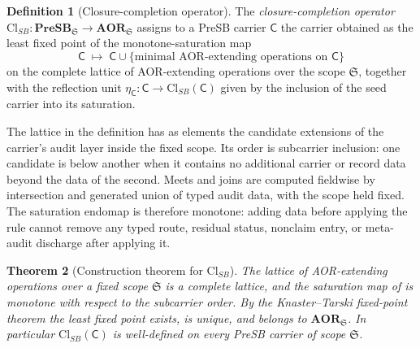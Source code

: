 \documentclass[11pt]{article}
\newcommand{\PreSB}{\mathbf{PreSB}}
\newcommand{\AOR}{\mathbf{AOR}}
\newcommand{\ClSB}{\mathrm{Cl}_{SB}}
\newtheorem{theorem}{Theorem}[section]
\theoremstyle{definition}
\newtheorem{definition}[theorem]{Definition}
\begin{document}
\begin{definition}[Closure-completion operator]\label{def:aor:cl-sb-operator}
The \emph{closure-completion operator}
$\ClSB:\PreSB_{\mathfrak S}\to\AOR_{\mathfrak S}$ assigns to a PreSB
carrier $\mathsf C$ the carrier obtained as the least fixed point of
the monotone-saturation map
\[
  \mathsf C \;\longmapsto\;
  \mathsf C \cup \{\text{minimal AOR-extending operations on }\mathsf C\}
\]
on the complete lattice of AOR-extending operations over the scope
$\mathfrak S$, together with the reflection unit
$\eta_{\mathsf C}:\mathsf C\to\ClSB(\mathsf C)$ given by the inclusion
of the seed carrier into its saturation.
\end{definition}

The lattice in the definition has as elements the candidate extensions
of the carrier's audit layer inside the fixed scope.  Its order is
subcarrier inclusion: one candidate is below another when it contains
no additional carrier or record data beyond the data of the second.
Meets and joins are computed fieldwise by intersection and generated
union of typed audit data, with the scope held fixed.  The saturation
endomap is therefore monotone: adding data before applying the rule
cannot remove any typed route, residual status, nonclaim entry, or
meta-audit discharge after applying it.

\begin{theorem}[Construction theorem for $\ClSB$]\label{thm:aor:cl-sb-construction}
The lattice of AOR-extending operations over a fixed scope
$\mathfrak S$ is a complete lattice, and the saturation map of
 is monotone with respect to the
subcarrier order.  By the Knaster--Tarski fixed-point theorem the
least fixed point exists, is unique, and belongs to
$\AOR_{\mathfrak S}$.  In particular $\ClSB(\mathsf C)$ is well-defined
on every PreSB carrier of scope $\mathfrak S$.
\end{theorem}
\end{document}

